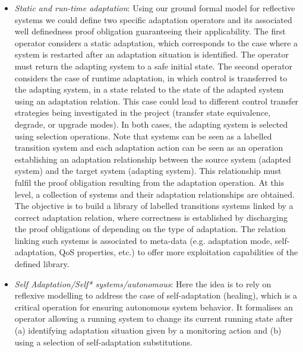 \documentclass[a4paper,11pt]{article}
\begin{document}
\begin{itemize}
\item \emph{Static and run-time adaptation}: Using our ground formal model for reflective systems we could define two specific adaptation operators and its associated well definedness proof obligation guaranteeing their applicability. The first operator considers a static adaptation, which corresponds to the case where a system is restarted after an adaptation situation is identified. The operator must return the adapting system to a safe initial state. The second operator considers the case of runtime adaptation, in which control is transferred to the adapting system, in a state related to the state of the adapted system using an adaptation relation. This case could lead to different control transfer strategies being investigated in the project (transfer state equivalence, degrade, or upgrade modes). In both cases, the adapting system is selected using selection operations. Note that systems can be seen as a labelled transition system and each adaptation action can be seen as an operation establishing an adaptation relationship between the source  system  (adapted  system) and  the  target  system  (adapting  system).  This  relationship  must  fulfil  the  proof obligation resulting from the adaptation operation. At this level, a collection of systems and their adaptation relationships are obtained. The objective is to build a library of labelled transitions systems linked by a correct adaptation relation, where correctness is established by discharging the proof obligations of depending on the type of adaptation.  The relation linking such systems is associated to meta-data (e.g.  adaptation mode, self-adaptation,  QoS properties, etc.)  to offer more exploitation capabilities of the defined library.

\item \emph{Self Adaptation/Self* systems/autonomous}: Here the idea is to rely on reflexive modelling to address the case of self-adaptation (healing), which is a critical operation for ensuring autonomous system behavior. It formalises an operator allowing a running system to change its  current running state after (a) identifying adaptation situation given by a monitoring action and (b) using a selection of self-adaptation substitutions.



\end{itemize}
\end{document}
